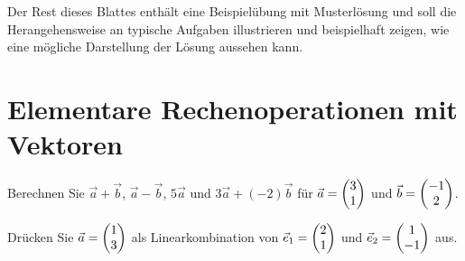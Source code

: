 \documentclass[11pt]{scrartcl}
\begin{document}
\sepline[.75\textwidth]

Der Rest dieses Blattes enthält eine Beispielübung mit Musterlösung und soll die Herangehensweise an typische Aufgaben illustrieren und beispielhaft zeigen, wie eine mögliche Darstellung der Lösung aussehen kann. 

\section{Elementare Rechenoperationen mit Vektoren}
\begin{subex}
  \item Berechnen Sie $\vec{a} + \vec{b}$, $\vec{a} - \vec{b}$, $5 \vec{a}$ und $3 \vec{a} + (-2) \vec{b}$ für $\vec{a} = \begin{pmatrix}3 \\ 1\end{pmatrix}$ und $\vec{b} = \begin{pmatrix} -1 \\ 2 \end{pmatrix}$.
  \item Drücken Sie $\vec{a} = \begin{pmatrix} 1 \\ 3 \end{pmatrix}$ als Linearkombination von $\vec{e}_1 = \begin{pmatrix} 2 \\ 1 \end{pmatrix}$ und $\vec{e}_2 = \begin{pmatrix} 1 \\ -1 \end{pmatrix}$ aus.
\end{subex}
\end{document}
